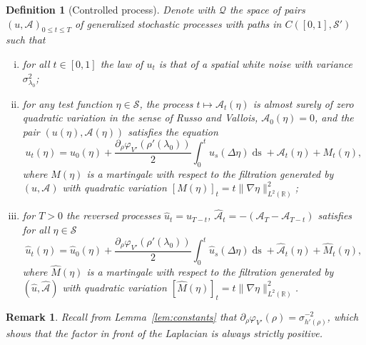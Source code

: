 \documentclass[11pt, a4paper]{article}
\newcommand{\tmop}[1]{\ensuremath{\operatorname{#1}}}
\newenvironment{enumerateroman}{\begin{enumerate}[i.] }{\end{enumerate}}
\newtheorem{definition}[theorem]{Definition}
\newtheorem{remark}[theorem]{Remark}
\newcommand{\CS}{\mathscr{S}}
\newcommand{\1}{\mathbf{1}}
\begin{document}
\begin{definition}[Controlled process]  
  Denote with $\mathcal{Q}$ the space of pairs $(u, \mathcal{A})_{0 \leqslant
  t \leqslant T}$ of generalized stochastic processes with paths in $C \left(
  [0, 1], \CS' \right)$ such that
  \begin{enumerateroman}
    \item for all $t \in [0, 1]$ the law of $u_t$ is that of a spatial
    white noise with variance $\sigma_{\lambda_0}^2$;
    
    \item for any test function $\eta \in \CS$, the process $t \mapsto
    \mathcal{A}_t (\eta)$ is almost surely of zero quadratic variation in the
    sense of Russo and Vallois, $\mathcal{A}_0 (\eta) = 0$, and the pair $(u
    (\eta), \mathcal{A} (\eta))$ satisfies the equation
    \[ u_t (\eta) = u_0 (\eta) + \frac{\partial_{\rho} \varphi_{V'} (\rho'
       (\lambda_0))}{2} \int_0^t u_s (\Delta \eta) \tmop{ds} +\mathcal{A}_t
       (\eta) + M_t (\eta), \]
    where $M (\eta)$ is a martingale with respect to the filtration generated
    by $(u, \mathcal{A})$ with quadratic variation $[M (\eta)]_t = t \| \nabla
    \eta \|_{L^2 (\mathbb{R})}^2$;
    
    \item for $T > 0$ the reversed processes $\hat{u}_t = u_{T - t}$,
    $\hat{\mathcal{A}}_t = - (\mathcal{A}_T -\mathcal{A}_{T - t})$ satisfies
    for all $\eta \in \CS$
    \[ \hat{u}_t (\eta) = \hat{u}_0 (\eta) + \frac{\partial_{\rho}
       \varphi_{V'} (\rho' (\lambda_0))}{2} \int_0^t \hat{u}_s (\Delta \eta)
       \tmop{ds} + \hat{\mathcal{A}}_t (\eta) + \hat{M}_t (\eta), \]
    where $\hat{M} (\eta)$ is a martingale with respect to the filtration
    generated by $(\hat{u}, \hat{\mathcal{A}})$ with quadratic variation
    $[\hat{M} (\eta)]_t = t \| \nabla \eta \|_{L^2 (\mathbb{R})}^2$.
  \end{enumerateroman}
\end{definition}

\begin{remark}
  Recall from Lemma~\ref{lem:constants} that $\partial_{\rho} \varphi_{V'} (\rho) = \sigma_{h'(\rho)}^{-2}$, which shows that the factor in front of the Laplacian is always strictly positive.
\end{remark}
\end{document}
